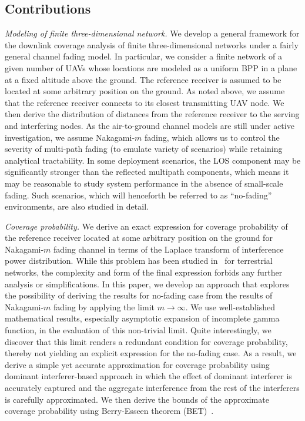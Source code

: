 \documentclass[journal,draftclsnofoot,onecolumn,12pt]{IEEEtran}
\begin{document}
\subsection{Contributions}
{\em{Modeling of finite three-dimensional network.}} We develop a general framework for the downlink coverage analysis of finite three-dimensional networks under a fairly general channel fading model. In particular, we consider a finite network of a given number of UAVs whose locations are modeled as a uniform BPP in a plane at a fixed altitude above the ground. The reference receiver is assumed to be located at some arbitrary position on the ground. As noted above, we assume that the reference receiver connects to its closest transmitting UAV node. We then derive the distribution of distances from the reference receiver to the serving and interfering nodes. As the air-to-ground channel models are still under active investigation, we assume Nakagami-$m$ fading, which allows us to control the severity of multi-path fading (to emulate variety of scenarios) while retaining analytical tractability. In some deployment scenarios, the LOS component may be significantly stronger than the reflected multipath components, which means it may be reasonable to study system performance in the absence of small-scale fading. Such scenarios, which will henceforth be referred to as ``no-fading'' environments, are also studied in detail.%

{\em{Coverage probability.}} We derive an exact expression for coverage probability of the reference receiver located at some arbitrary position on the ground for Nakagami-$m$ fading channel in terms of the Laplace transform of interference power distribution. While this problem has been studied in~\cite{durrani} for terrestrial networks, the complexity and form of the final expression forbids any further analysis or simplifications. In this paper, we develop an approach that explores the possibility of deriving the results for no-fading case from the results of Nakagami-$m$ fading by applying the limit $m\to \infty$. We use well-established mathematical results, especially asymptotic expansion of incomplete gamma function, in the evaluation of this non-trivial limit. Quite interestingly, we discover that this limit renders a redundant condition for coverage probability, thereby not yielding an explicit expression for the no-fading case. As a result, we derive a simple yet accurate approximation for coverage probability using dominant interferer-based approach in which the effect of dominant interferer is accurately captured and the aggregate interference from the rest of the interferers is carefully approximated. We then derive the bounds of the approximate coverage probability using Berry-Esseen theorem (BET)~\cite{BET}. 
\end{document}
